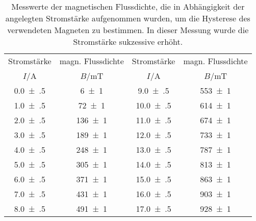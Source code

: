\begin{table}[!h]
	\centering
	\begin{tabular}{cccc}
		\toprule
		Stromstärke & magn. Flussdichte & Stromstärke & magn. Flussdichte\\
		$I$/\si{\ampere} & $B$/\si{\milli\tesla} & $I$/\si{\ampere} & $B$/\si{\milli\tesla}\\
\midrule
		\num{0.0(5)} & \num{6(1)} & \num{9.0(5)} & \num{553(1)}\\
		\num{1.0(5)} & \num{72(1)} & \num{10.0(5)} & \num{614(1)}\\
		\num{2.0(5)} & \num{136(1)} & \num{11.0(5)} & \num{674(1)}\\
		\num{3.0(5)} & \num{189(1)} & \num{12.0(5)} & \num{733(1)}\\
		\num{4.0(5)} & \num{248(1)} & \num{13.0(5)} & \num{787(1)}\\
		\num{5.0(5)} & \num{305(1)} & \num{14.0(5)} & \num{813(1)}\\
		\num{6.0(5)} & \num{371(1)} & \num{15.0(5)} & \num{863(1)}\\
		\num{7.0(5)} & \num{431(1)} & \num{16.0(5)} & \num{903(1)}\\
		\num{8.0(5)} & \num{491(1)} & \num{17.0(5)} & \num{928(1)}\\
		\bottomrule
	\end{tabular}
	\caption{Messwerte der magnetischen Flussdichte, die in Abhängigkeit der angelegten Stromstärke
                        aufgenommen wurden, um die Hysterese des verwendeten Magneten zu bestimmen. 
                        In dieser Messung wurde die Stromstärke sukzessive erhöht. \label{tab:hysterese_zunehmend}}
\end{table}
